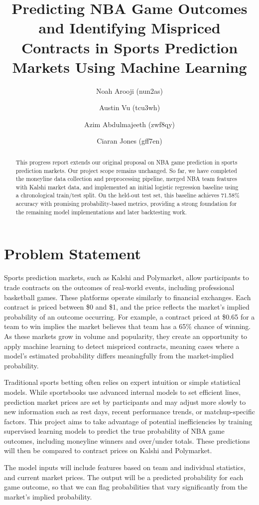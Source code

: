 \documentclass[sigconf]{acmart}
\title{Predicting NBA Game Outcomes and Identifying Mispriced Contracts in Sports Prediction Markets Using Machine Learning}
\author{Noah Arooji (nun2as)}
\affiliation{}
\author{Austin Vu (tcu3wh)}
\affiliation{}
\author{Azim Abdulmajeeth (zwf8qy)}
\affiliation{}
\author{Ciaran Jones (gff7en)}
\affiliation{}
\begin{document}
\begin{abstract}
This progress report extends our original proposal on NBA game prediction in sports prediction markets. Our project scope remains unchanged. So far, we have completed the moneyline data collection and preprocessing pipeline, merged NBA team features with Kalshi market data, and implemented an initial logistic regression baseline using a chronological train/test split. On the held-out test set, this baseline achieves 71.58\% accuracy with promising probability-based metrics, providing a strong foundation for the remaining model implementations and later backtesting work.
\end{abstract}

\maketitle

\section{Problem Statement}
Sports prediction markets, such as Kalshi and Polymarket, allow participants to trade contracts on the outcomes of real-world events, including professional basketball games. These platforms operate similarly to financial exchanges. Each contract is priced between \$0 and \$1, and the price reflects the market's implied probability of an outcome occurring. For example, a contract priced at \$0.65 for a team to win implies the market believes that team has a 65\% chance of winning. As these markets grow in volume and popularity, they create an opportunity to apply machine learning to detect mispriced contracts, meaning cases where a model's estimated probability differs meaningfully from the market-implied probability.

Traditional sports betting often relies on expert intuition or simple statistical models. While sportsbooks use advanced internal models to set efficient lines, prediction market prices are set by participants and may adjust more slowly to new information such as rest days, recent performance trends, or matchup-specific factors. This project aims to take advantage of potential inefficiencies by training supervised learning models to predict the true probability of NBA game outcomes, including moneyline winners and over/under totals. These predictions will then be compared to contract prices on Kalshi and Polymarket.

The model inputs will include features based on team and individual statistics, and current market prices. The output will be a predicted probability for each game outcome, so that we can flag probabilities that vary significantly from the market's implied probability.
\end{document}
